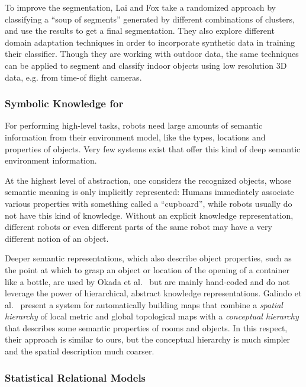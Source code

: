 To improve the segmentation, Lai and Fox \cite{Lai-RSS-09} take a randomized approach
by classifying a ``soup of segments'' generated by different combinations of clusters,
and use the results to get a final segmentation. They also explore different domain
adaptation techniques in order to incorporate synthetic data in training their classifier.
Though they are working with outdoor data, the same techniques can be applied to segment
and classify indoor objects using low resolution 3D data, e.g. from time-of flight cameras.\\
\subsubsection{Symbolic Knowledge for \ksem}
\label{sec:knowledge-representation}
For performing high-level tasks, robots need large amounts of semantic information from their environment model,
like the types, locations and properties of objects. Very few systems exist that offer this kind
of deep semantic environment information.

At the highest level of abstraction, one considers
the recognized objects, whose semantic meaning is only implicitly represented: Humans immediately
associate various properties with something called a ``cupboard'', while robots usually do not have
this kind of knowledge. Without an explicit knowledge representation, different robots or even different
parts of the same robot may have a very different notion of an object.

Deeper semantic representations, which also describe object properties, such as the point at which to grasp
an object or location of the opening of a container like a bottle, are used by Okada et al.~\cite{okada2007iros} but are mainly hand-coded
and do not leverage the power of hierarchical, abstract knowledge representations.
Galindo et al.~\cite{galindo08taskplanning} present a system for automatically building maps that
combine a \emph{spatial hierarchy} of local metric and global topological maps with a \emph{conceptual
hierarchy} that describes some semantic properties of rooms and objects. In this respect, their approach is
similar to ours, but the conceptual hierarchy is much simpler and the spatial description much coarser.\\

\subsubsection{Statistical Relational Models}
\label{sec:markov}

